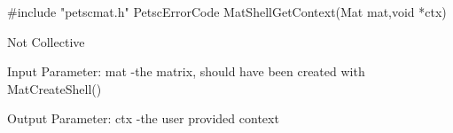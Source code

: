 #include "petscmat.h"
PetscErrorCode  MatShellGetContext(Mat mat,void *ctx)

Not Collective

Input Parameter:
mat -the matrix, should have been created with MatCreateShell()

Output Parameter:
ctx -the user provided context
